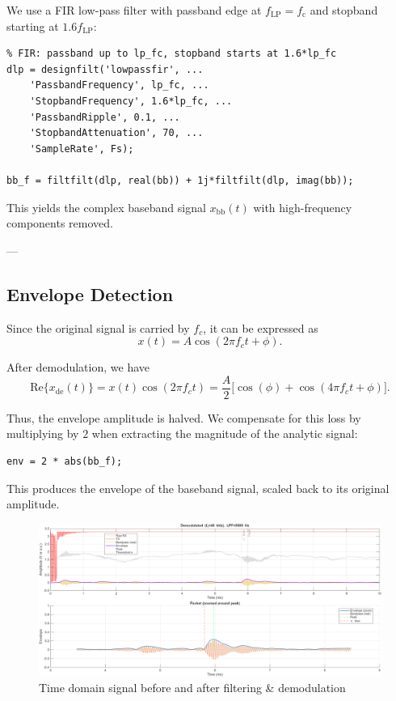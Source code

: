 \documentclass[10pt]{article}
\begin{document}
We use a FIR low-pass filter with passband edge at $f_{\mathrm{LP}} = f_{\mathrm{c}}$ and stopband starting at $1.6 f_{\mathrm{LP}}$:

\begin{lstlisting}
% FIR: passband up to lp_fc, stopband starts at 1.6*lp_fc
dlp = designfilt('lowpassfir', ...
    'PassbandFrequency', lp_fc, ...
    'StopbandFrequency', 1.6*lp_fc, ...
    'PassbandRipple', 0.1, ...          
    'StopbandAttenuation', 70, ...
    'SampleRate', Fs);

bb_f = filtfilt(dlp, real(bb)) + 1j*filtfilt(dlp, imag(bb));
\end{lstlisting}

This yields the complex baseband signal $x_{\mathrm{bb}}(t)$ with high-frequency components removed.

---

\subsection*{Envelope Detection}

Since the original signal is carried by $f_c$, it can be expressed as
\[
x(t) = A \cos(2\pi f_c t + \phi).
\]

After demodulation, we have
\[
\mathrm{Re}\{x_{\mathrm{de}}(t)\} = x(t)\cos(2\pi f_c t)
= \frac{A}{2} \bigl[\cos(\phi) + \cos(4 \pi f_c t + \phi)\bigr].
\]

Thus, the envelope amplitude is halved. We compensate for this loss by multiplying by $2$ when extracting the magnitude of the analytic signal:

\begin{lstlisting}
env = 2 * abs(bb_f);
\end{lstlisting}

This produces the envelope of the baseband signal, scaled back to its original amplitude.

\begin{figure}[!h]
	\centering 
		\includegraphics[width = .99\columnwidth]{fig/100_tdomain_raw_processed}	
	\caption{Time domain signal before and after filtering \& demodulation}
\label{fig:tdom_raw and processed}
\end{figure}
\end{document}
